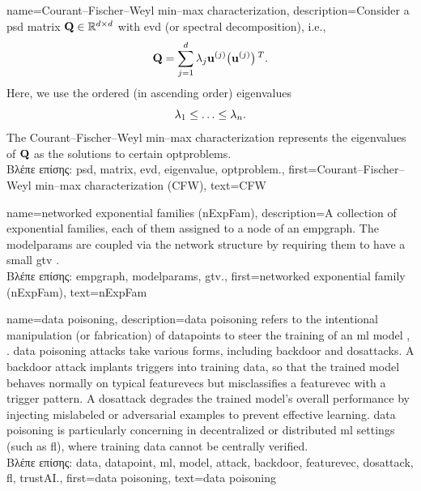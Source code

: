 {name={Courant–Fischer–Weyl min–max characterization}, 
	description={Consider a \gls{psd} 
		\gls{matrix} $\mathbf{Q} \in \mathbb{R}^{d \times d}$ with \gls{evd} (or spectral decomposition), i.e.,
		$$\mathbf{Q} = \sum_{j=1}^{d} \lambda_{j} {\bf u}^{(j)} \big(  {\bf u}^{(j)}  \big)\,^{T}.$$ 
		Here, we use the ordered (in ascending order) \gls{eigenvalue}s 
		\begin{equation}
			\nonumber
			 \lambda_{1}  \leq  \ldots \leq \lambda_{n}. 
		\end{equation}
		The Courant–Fischer–Weyl min–max characterization \cite[Th. 8.1.2]{GolubVanLoanBook} 
		represents the \gls{eigenvalue}s of $\mathbf{Q}$ as the solutions to certain \gls{optproblem}s.\\
		\foreignlanguage{greek}{Βλέπε επίσης:} \gls{psd}, \gls{matrix}, \gls{evd}, \gls{eigenvalue}, \gls{optproblem}.}, 
	first={Courant–Fischer–Weyl min–max characterization (CFW)}, 
	text={CFW}
}

{name={networked exponential families (nExpFam)}, 
	description={A collection of exponential 
		families, each of them assigned to a node of an \gls{empgraph}. The \gls{modelparams} are coupled 
	   	via the network structure by requiring them to have a small \gls{gtv} \cite{JungNetExp2020}.\\
	   	\foreignlanguage{greek}{Βλέπε επίσης:} \gls{empgraph}, \gls{modelparams}, \gls{gtv}.},
	  first={networked exponential family (nExpFam)},
	  text={nExpFam}  
}
 
{name={data poisoning}, 
 	description={\Gls{data} poisoning refers to the intentional manipulation 
  		(or fabrication) of \gls{datapoint}s to steer the training of an \gls{ml} \gls{model} \cite{Liu2021}, \cite{PoisonGAN}. 
  		\Gls{data} poisoning \gls{attack}s take various forms, including \gls{backdoor} and \gls{dosattack}s.
  		A \gls{backdoor} \gls{attack} implants triggers into training \gls{data}, so that the trained \gls{model} 
  		behaves normally on typical \gls{featurevec}s but misclassifies a \gls{featurevec} with a trigger pattern.
  		A \gls{dosattack} degrades the trained \gls{model}'s overall performance by injecting mislabeled or 
  		adversarial examples to prevent effective learning.
		\Gls{data} poisoning is particularly concerning in decentralized or distributed \gls{ml} settings (such as \gls{fl}), 
		where training \gls{data} cannot be centrally verified. \\
		\foreignlanguage{greek}{Βλέπε επίσης:} \gls{data}, \gls{datapoint}, \gls{ml}, \gls{model}, \gls{attack}, \gls{backdoor}, 
		\gls{featurevec}, \gls{dosattack}, \gls{fl}, \gls{trustAI}.},
	first={data poisoning},
	text={data poisoning}
}

